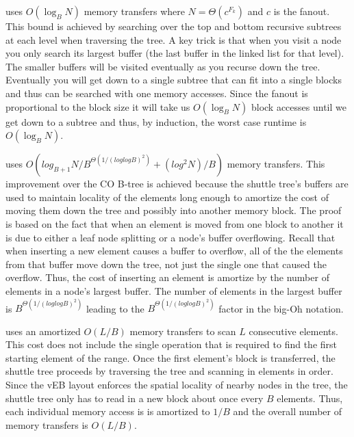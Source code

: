 \documentclass[preprint]{style}
\begin{document}
\Search{} uses $O(\log_{B}{N})$ memory transfers where $N = \Theta(c^{F_k})$ and
$c$ is the fanout. This bound is achieved by searching over the
top and bottom recursive subtrees at each level when traversing the tree. A
key trick is that when you visit a node you only search its largest buffer
(the last buffer in the linked list for that level). The smaller buffers will
be visited eventually as you recurse down the tree. Eventually you will get
down to a single subtree that can fit into a single blocks and thus can be
searched with one memory accesses. Since the fanout is proportional to the
block size it will take us $O(\log_B N)$ block accesses until we get down to a
subtree and thus, by induction, the worst case runtime is $O(\log_B N)$.



\Insert{} uses $O(log_{B+1} N / B^{\Theta(1/(loglogB)^2)} + (log^2 N) / B)$
memory transfers. This improvement over the CO B-tree is achieved because the
shuttle tree's buffers are used to maintain locality of the elements long
enough to amortize the cost of moving them down the tree and possibly into
another memory block. The proof is based on the fact that when an element is
moved from one block to another it is due to either a leaf node splitting or a
node's buffer overflowing. Recall that when inserting a new element causes a
buffer to overflow, all of the the elements from that buffer move down the
tree, not just the single one that caused the overflow. Thus, the cost of
inserting an element is amortize by the number of elements in a node's largest
buffer. The number of elements in the largest buffer is
$B^{\Theta(1/(loglogB)^2)}$ leading to the $B^{\Theta(1/(loglogB)^2)}$ factor
in the big-Oh notation.

\Scan{} uses an amortized $O(L/B)$ memory transfers to scan $L$ consecutive
elements. This cost does not include the single \Search{} operation that is
required to find the first starting element of the range. Once the first
element's block is transferred, the shuttle tree proceeds by traversing the
tree and scanning in elements in order. Since the vEB layout enforces the
spatial locality of nearby nodes in the tree, the shuttle tree only has to read
in a new block about once every $B$ elements. Thus, each individual memory
access is is amortized to $1/B$ and the overall number of memory transfers is
$O(L/B)$.
\end{document}
